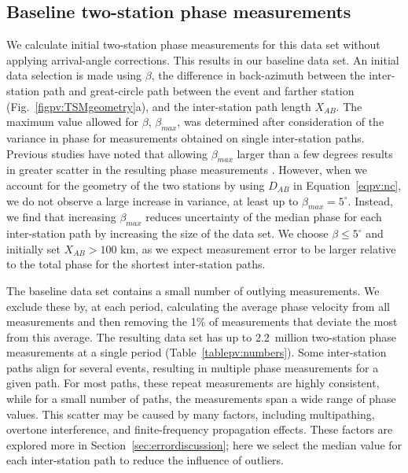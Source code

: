 \documentclass[12pt,oneside]{book}
\newcommand{\degree}[1]{\mbox{$#1^{\circ}$}}
\begin{document}
\subsection{Baseline two-station phase measurements}
We calculate initial two-station phase measurements for this data set without applying arrival-angle corrections. This results in our baseline data set. An initial data selection is made using $\beta$, the difference in back-azimuth between the inter-station path and great-circle path between the event and farther station (Fig.~\ref{figpv:TSMgeometry}a), and the inter-station path length $X_{AB}$. The maximum value allowed for $\beta$, $\beta_{max}$, was determined after consideration of the variance in phase for measurements obtained on single inter-station paths. Previous studies have noted that allowing $\beta_{max}$ larger than a few degrees results in greater scatter in the resulting phase measurements \citep[e.g.,][]{Prindle2006}. However, when we account for the geometry of the two stations by using $D_{AB}$ in Equation~\ref{eqpv:nc}, we do not observe a large increase in variance, at least up to $\beta_{max} = \degree{5}$. Instead, we find that increasing $\beta_{max}$ reduces uncertainty of the median phase for each inter-station path by increasing the size of the data set. We choose $\beta \leq \degree{5}$ and initially set $X_{AB} > 100$ km, as we expect measurement error to be larger relative to the total phase for the shortest inter-station paths.

The baseline data set contains a small number of outlying measurements. We exclude these by, at each period, calculating the average phase velocity from all measurements and then removing the 1\% of measurements that deviate the most from this average. The resulting data set has up to 2.2~million two-station phase measurements at a single period (Table~\ref{tablepv:numbers}). Some inter-station paths align for several events, resulting in multiple phase measurements for a given path. For most paths, these repeat measurements are highly consistent, while for a small number of paths, the measurements span a wide range of phase values. This scatter may be caused by many factors, including multipathing, overtone interference, and finite-frequency propagation effects. These factors are explored more in Section~\ref{sec:errordiscussion}; here we select the median value for each inter-station path to reduce the influence of outliers. 
\end{document}
